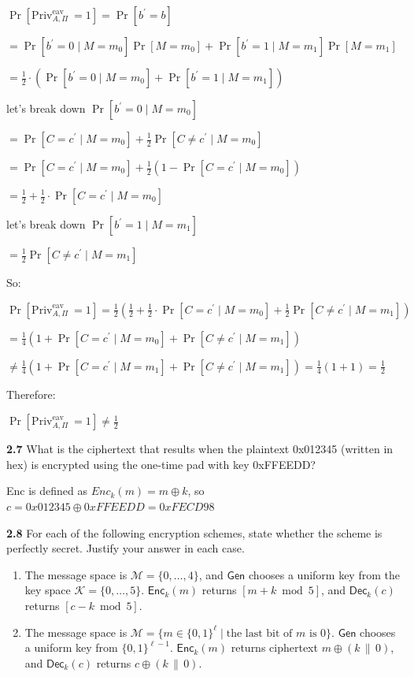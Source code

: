 $\Pr[\text{Priv}^{\text{eav}}_{A, \Pi}\ = 1] = \Pr[b^\prime = b]$

$= \Pr[b^\prime = 0 \mid M = m_0]\Pr[M = m_0] + \Pr[b^\prime = 1 \mid M = m_1]\Pr[M = m_1]$


$= \frac{1}{2} \cdot ( \Pr[b^\prime = 0 \mid M = m_0] + \Pr[b^\prime = 1 \mid M = m_1])$

let's break down $ \Pr[b^\prime = 0 \mid M = m_0]$

$= \Pr[C = c^\prime \mid M = m_0] + \frac{1}{2} \Pr[C \ne c^\prime \mid M = m_0] $ 

$= \Pr[C = c^\prime \mid M = m_0] + \frac{1}{2} ( 1 -  \Pr[C = c^\prime \mid M = m_0] )$ 

$= \frac{1}{2} + \frac{1}{2} \cdot \Pr[C = c^\prime \mid M = m_0]$ 

let's break down $ \Pr[b^\prime = 1 \mid M = m_1]$

$= \frac{1}{2} \Pr[C \ne c^\prime \mid M = m_1]$ 

So:

$\Pr[\text{Priv}^{\text{eav}}_{A, \Pi}\ = 1] = \frac{1}{2} (\frac{1}{2} + \frac{1}{2} \cdot \Pr[C = c^\prime \mid M = m_0] +  \frac{1}{2} \Pr[C \ne c^\prime \mid M = m_1])$

$= \frac{1}{4} (1 + \Pr[C = c^\prime \mid M = m_0] +  \Pr[C \ne c^\prime \mid M = m_1])$

$\ne \frac{1}{4} (1 + \Pr[C = c^\prime \mid M = m_1] +  \Pr[C \ne c^\prime \mid M = m_1]) = \frac{1}{4} (1 + 1) = \frac{1}{2}$

Therefore:

$\Pr[\text{Priv}^{\text{eav}}_{A, \Pi}\ = 1] \ne \frac{1}{2}$

\newpage
\noindent
\textbf{2.7} \hspace{1em} What is the ciphertext that results when the plaintext 0x012345 (written in hex) is encrypted using the one-time pad with key 0xFFEEDD?
\vspace{1em}

Enc is defined as $Enc_k(m) = m \oplus k$, so $c = 0x012345 \oplus 0xFFEEDD = 0xFECD98$


\vspace{1em}
\noindent
\textbf{2.8} \hspace{1em} For each of the following encryption schemes, state whether the scheme is perfectly secret. Justify your answer in each case.
\vspace{1em}

\begin{enumerate}
	\item[(a)] The message space is $\mathcal{M} = \{0, \ldots, 4\}$, and $\textsf{Gen}$ chooses a uniform key from the key space $\mathcal{K} = \{0, \ldots, 5\}$. $\textsf{Enc}_k(m)$ returns $[m + k \bmod 5]$, and $\textsf{Dec}_k(c)$ returns $[c - k \bmod 5]$.
	
	\item[(b)] The message space is $\mathcal{M} = \{ m \in \{0,1\}^{\ell} \mid \text{the last bit of } m \text{ is } 0 \}$. $\textsf{Gen}$ chooses a uniform key from $\{0,1\}^{\ell - 1}$. $\textsf{Enc}_k(m)$ returns ciphertext $m \oplus (k \,\|\, 0)$, and $\textsf{Dec}_k(c)$ returns $c \oplus (k \,\|\, 0)$.
\end{enumerate}


